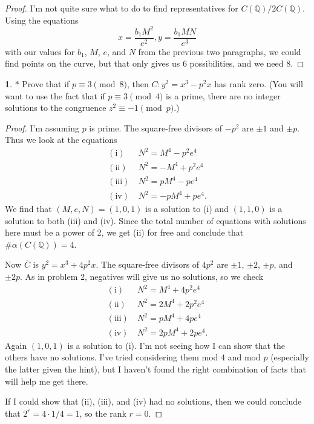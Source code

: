 \documentclass[12pt]{article}
\theoremstyle{definition}
\newtheorem{ex}{}
\begin{document}
\begin{proof}
	I'm not quite sure what to do to find representatives for $C(\mathbb{Q})/2C(\mathbb{Q})$.
	Using the equations \begin{equation*}
		x = \frac{b_1M^2}{e^2}, y = \frac{b_1MN}{e^3}
	\end{equation*}
	with our values for $b_1$, $M$, $e$, and $N$ from the previous two paragraphs, we could find points on the curve, but that only gives us 6 possibilities, and we need 8.
\end{proof}

\begin{ex}
	$*$ Prove that if $p \equiv 3 \pmod{8}$, then
	$C : y^{2} = x^{3} - p^{2} x$ has rank zero. (You will want to use
	the fact that if $p \equiv 3 \pmod{4}$ is a prime, there are no integer
	solutions to the congruence $z^{2} \equiv -1 \pmod{p}$.)
\end{ex}
\begin{proof}
	I'm assuming $p$ is prime.
	The square-free divisors of $-p^2$ are $\pm 1$ and $\pm p$.
	Thus we look at the equations \begin{align*}
		(\text{i})   & \ N^2 = M^4 - p^2e^4  \\
		(\text{ii})  & \ N^2 = -M^4 + p^2e^4 \\
		(\text{iii}) & \ N^2 = pM^4 - pe^4   \\
		(\text{iv})  & \ N^2 = -pM^4 + pe^4.
	\end{align*}
	We find that $(M, e, N) = (1, 0, 1)$ is a solution to (i) and $(1, 1, 0)$ is a solution to both (iii) and (iv).
	Since the total number of equations with solutions here must be a power of 2, we get (ii) for free and conclude that $\#\alpha(C(\mathbb{Q})) = 4$.

	Now $\overline{C}$ is $y^2 = x^3 + 4p^2x$.
	The square-free divisors of $4p^2$ are $\pm 1$, $\pm 2$, $\pm p$, and $\pm 2p$.
	As in problem 2, negatives will give us no solutions, so we check \begin{align*}
		(\text{i})   & \ N^2 = M^4 + 4p^2e^4  \\
		(\text{ii})  & \ N^2 = 2M^4 + 2p^2e^4 \\
		(\text{iii}) & \ N^2 = pM^4 + 4pe^4   \\
		(\text{iv})  & \ N^2 = 2pM^4 + 2pe^4.
	\end{align*}
	Again $(1, 0, 1)$ is a solution to (i).
	I'm not seeing how I can show that the others have no solutions.
	I've tried considering them mod 4 and mod $p$ (especially the latter given the hint), but I haven't found the right combination of facts that will help me get there.

	If I could show that (ii), (iii), and (iv) had no solutions, then we could conclude that $2^r = 4 \cdot 1 / 4 = 1$, so the rank $r = 0$.
\end{proof}
\end{document}

